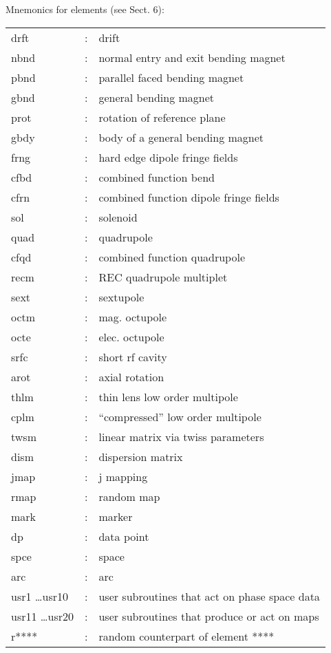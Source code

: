 \newpage
{}
\vspace{5mm}
\begin{table}[h]

\noindent Mnemonics for elements (see Sect. 6):

\begin{center}
\begin{tabular}{lll} drft &: & drift\\ nbnd &: & normal entry and exit
bending magnet\\ pbnd &: & parallel faced bending magnet\\ gbnd &: &
general bending magnet\\ prot &: & rotation of reference plane\\ gbdy &: &
body of a general bending magnet\\ frng &: & hard edge dipole fringe
fields\\ cfbd &: & combined function bend\\ cfrn &: & combined function
dipole fringe fields\\ sol &: & solenoid\\ quad &: & quadrupole\\ cfqd &: &
combined function quadrupole\\ recm &: & REC quadrupole multiplet\\ sext &:
& sextupole\\ octm &: & mag. octupole\\ octe &: & elec. octupole\\ srfc &:
& short rf cavity\\ arot &: & axial rotation\\ thlm &: & thin lens low
order multipole\\ cplm &: & ``compressed'' low order multipole\\ twsm &: &
linear matrix via twiss parameters\\ dism &: & dispersion matrix\\ jmap &:
& j mapping\\ rmap &: & random map\\ mark &: & marker\\ dp &: & data
point\\ spce &: & space\\ arc &: & arc\\ usr1 \ldots usr10 &: & user
subroutines that act on phase space data\\ usr11 \ldots usr20 &: & user
subroutines that produce or act on maps\\ r**** &: & random counterpart of
element ****
\end{tabular}
\end{center}
\end{table}

